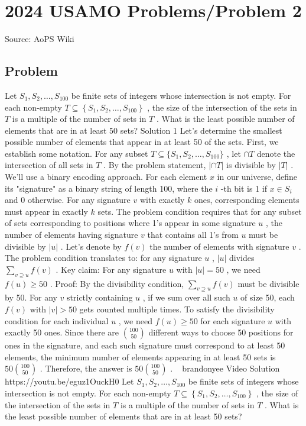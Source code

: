 \documentclass[12pt]{article}
\begin{document}
\section*{{2024 USAMO Problems/Problem 2}}
Source: AoPS Wiki

\subsection*{Problem}
Let $S_1, S_2, \ldots, S_{100}$ be finite sets of integers whose intersection is not empty. For each non-empty $T \subseteq\left\{S_1, S_2, \ldots, S_{100}\right\}$ , the size of the intersection of the sets in $T$ is a multiple of the number of sets in $T$ . What is the least possible number of elements that are in at least 50 sets? Solution 1 Let's determine the smallest possible number of elements that appear in at least 50 of the sets. First, we establish some notation. For any subset $T \subseteq \{S_1, S_2, \ldots, S_{100}\}$ , let $\cap T$ denote the intersection of all sets in $T$ . By the problem statement, $|\cap T|$ is divisible by $|T|$ . We'll use a binary encoding approach. For each element $x$ in our universe, define its "signature" as a binary string of length 100, where the $i$ -th bit is 1 if $x \in S_i$ and 0 otherwise. For any signature $v$ with exactly $k$ ones, corresponding elements must appear in exactly $k$ sets. The problem condition requires that for any subset of sets corresponding to positions where 1's appear in some signature $u$ , the number of elements having signature $v$ that contains all 1's from $u$ must be divisible by $|u|$ . Let's denote by $f(v)$ the number of elements with signature $v$ . The problem condition translates to: for any signature $u$ , $|u|$ divides $\sum_{v \supseteq u} f(v)$ . Key claim: For any signature $u$ with $|u| = 50$ , we need $f(u) \geq 50$ . Proof: By the divisibility condition, $\sum_{v \supseteq u} f(v)$ must be divisible by 50. For any $v$ strictly containing $u$ , if we sum over all such $u$ of size 50, each $f(v)$ with $|v| > 50$ gets counted multiple times. To satisfy the divisibility condition for each individual $u$ , we need $f(u) \geq 50$ for each signature $u$ with exactly 50 ones. Since there are $\binom{100}{50}$ different ways to choose 50 positions for ones in the signature, and each such signature must correspond to at least 50 elements, the minimum number of elements appearing in at least 50 sets is $50 \binom{100}{50}$ . Therefore, the answer is $\boxed{50 \binom{100}{50}}$ . ~ brandonyee Video Solution https://youtu.be/eguz1OuckH0 Let $S_1, S_2, \ldots, S_{100}$ be finite sets of integers whose intersection is not empty. For each non-empty $T \subseteq\left\{S_1, S_2, \ldots, S_{100}\right\}$ , the size of the intersection of the sets in $T$ is a multiple of the number of sets in $T$ . What is the least possible number of elements that are in at least 50 sets?
\end{document}
